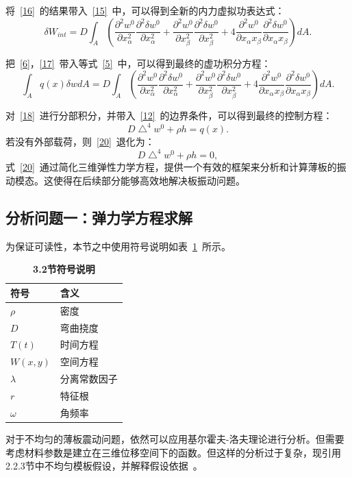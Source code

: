 \documentclass[withoutpreface,bwprint]{cumcmthesis} %
\begin{document}
将~\eqref{16}~的结果带入~\eqref{15}~中，可以得到全新的内力虚拟功表达式：
\begin{equation}
        \delta W_{int}=D\int_A\left(\frac{\partial^2w^0}{\partial x_{\alpha}^2}\frac{\partial^2\delta w^0}{\partial x_{\alpha}^2}+\frac{\partial^2w^0}{\partial x_{\beta}^2}\frac{\partial^2\delta w^0}{\partial x_{\beta}^2}+4\frac{\partial^2w^0}{\partial x_{\alpha}x_{\beta}}\frac{\partial^2\delta w^0}{\partial x_{\alpha}x_{\beta}}\right)dA.\label{17}
\end{equation}

把~\eqref{6}，\eqref{17}~带入等式~\eqref{5}~中，可以得到最终的虚功积分方程：
\begin{equation}
        \int_A q(x)\delta wdA=D\int_A\left(\frac{\partial^2 w^0}{\partial x_{\alpha}^2}\frac{\partial^2\delta w^0}{\partial x_{\alpha}^2}+\frac{\partial^2w^0}{\partial x_{\beta}^2}\frac{\partial^2\delta w^0}{\partial x_{\beta}^2}+4\frac{\partial^2w^0}{\partial x_{\alpha}x_{\beta}}\frac{\partial^2\delta w^0}{\partial x_{\alpha}x_{\beta}}\right)dA.\label{18}
\end{equation}

对~\eqref{18}~进行分部积分，并带入~\eqref{12}~的边界条件，可以得到最终的控制方程：
\begin{equation}
    D\bigtriangleup^4w^0+\rho h=q(x). \label{19}
\end{equation}
若没有外部载荷，则~\eqref{20}~退化为：
\begin{equation}
        D\bigtriangleup^4w^0+\rho h=0, \label{20}
\end{equation}
式~\eqref{20}~通过简化三维弹性力学方程，提供一个有效的框架来分析和计算薄板的振动模态。这使得在后续部分能够高效地解决板振动问题。
\subsection{分析问题一：弹力学方程求解}
为保证可读性，本节之中使用符号说明如表~\ref{table-4}~所示。
\begin{table}[!htbp]
	\caption{\textbf{3.2节符号说明}}%
	\centering
	\begin{tabular}{ll}%
		\hline %
		符号   &  含义  \\
		\hline %
	$\rho$&密度\\
	$D$&弯曲挠度\\
	$T(t)$&时间方程\\
	$W(x,y)$&空间方程\\
	$\lambda$&分离常数因子\\
	$r$&特征根\\
	$\omega$&角频率\\
		\hline %
	\end{tabular}\label{table-4}
\end{table}
对于不均匀的薄板震动问题，依然可以应用基尔霍夫-洛夫理论进行分析。但需要考虑材料参数是建立在三维位移空间下的函数。但这样的分析过于复杂，现引用2.2.3节中不均匀模板假设，并解释假设依据~\cite{ref3}\cite{ref4}。
\end{document}
